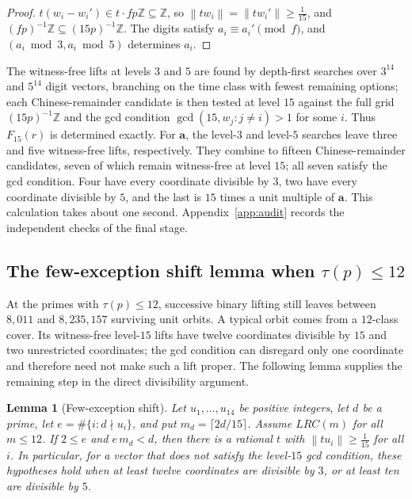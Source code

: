 \documentclass[11pt]{article}
\newtheorem{lemma}[theorem]{Lemma}
\theoremstyle{definition}
\theoremstyle{remark}
\newcommand{\Z}{\mathbb{Z}}
\newcommand{\vct}[1]{\mathbf{#1}}
\newcommand{\nearest}[1]{\left\lVert #1\right\rVert}
\begin{document}
\begin{proof}
$t(w_i-w_i')\in t\cdot fp\Z\subseteq\Z$, so
$\nearest{tw_i}=\nearest{tw_i'}\geq\frac1{15}$, and
$(fp)^{-1}\Z\subseteq(15p)^{-1}\Z$.  The digits satisfy
$a_i\equiv a_i'\pmod f$, and $(a_i\bmod3,a_i\bmod5)$ determines $a_i$.
\end{proof}

The witness-free lifts at levels $3$ and $5$ are found by depth-first
searches over $3^{14}$ and $5^{14}$ digit vectors, branching on the time
class with fewest remaining options; each Chinese-remainder candidate is
then tested at level $15$ against the full grid $(15p)^{-1}\Z$ and the
gcd condition $\gcd(15,w_j:j\neq i)>1$ for some $i$.  Thus $F_{15}(r)$ is determined
exactly.  For $\vct{a}$, the level-$3$ and level-$5$ searches leave three
and five witness-free lifts, respectively.  They combine to fifteen
Chinese-remainder candidates, seven of which remain witness-free at level
$15$; all seven satisfy the gcd condition.  Four have every coordinate
divisible by $3$, two have every coordinate divisible by $5$, and the last
is $15$ times a unit multiple of $\vct{a}$.  This calculation takes about
one second.  Appendix~\ref{app:audit} records the independent checks of the
final stage.

\subsection{The few-exception shift lemma when \texorpdfstring{$\tau(p)\leq12$}{tau(p) <= 12}}

At the primes with $\tau(p)\leq12$, successive binary lifting still leaves
between $8{,}011$ and $8{,}235{,}157$ surviving unit orbits.  A typical
orbit comes from a $12$-class cover.  Its witness-free level-$15$ lifts
have twelve coordinates divisible by $15$ and two unrestricted
coordinates; the gcd condition can disregard only one coordinate and
therefore need not make such a lift proper.  The following lemma supplies
the remaining step in the direct divisibility argument.

\begin{lemma}[Few-exception shift]\label{lem:neargcd}
Let $u_1,\ldots,u_{14}$ be positive integers, let $d$ be a prime, let
$e=\#\{i:d\nmid u_i\}$, and put $m_d=\lceil2d/15\rceil$.  Assume
$LRC(m)$ for all $m\leq12$.  If $2\leq e$ and $e\,m_d<d$, then there is a
rational $t$ with $\nearest{tu_i}\geq\frac1{15}$ for all $i$.  In
particular, for a vector that does not satisfy the level-$15$ gcd condition,
these hypotheses hold when at least twelve coordinates are divisible by
$3$, or at least ten are divisible by $5$.
\end{lemma}
\end{document}

